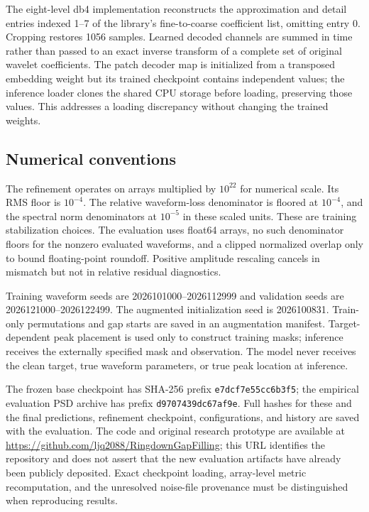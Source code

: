 \documentclass[10pt,prd,aps,a4paper,twocolumn,superscriptaddress,nofootinbib,floatfix]{revtex4-2}
\begin{document}
The eight-level db4 implementation reconstructs the approximation and detail entries indexed 1--7 of the library's fine-to-coarse coefficient list, omitting entry 0. Cropping restores 1056 samples. Learned decoded channels are summed in time rather than passed to an exact inverse transform of a complete set of original wavelet coefficients. The patch decoder map is initialized from a transposed embedding weight but its trained checkpoint contains independent values; the inference loader clones the shared CPU storage before loading, preserving those values. This addresses a loading discrepancy without changing the trained weights.

\subsection{Numerical conventions}
The refinement operates on arrays multiplied by $10^{22}$ for numerical scale. Its RMS floor is $10^{-4}$. The relative waveform-loss denominator is floored at $10^{-4}$, and the spectral norm denominators at $10^{-5}$ in these scaled units. These are training stabilization choices. The evaluation uses float64 arrays, no such denominator floors for the nonzero evaluated waveforms, and a clipped normalized overlap only to bound floating-point roundoff. Positive amplitude rescaling cancels in mismatch but not in relative residual diagnostics.

Training waveform seeds are 2026101000--2026112999 and validation seeds are 2026121000--2026122499. The augmented initialization seed is 2026100831. Train-only permutations and gap starts are saved in an augmentation manifest. Target-dependent peak placement is used only to construct training masks; inference receives the externally specified mask and observation. The model never receives the clean target, true waveform parameters, or true peak location at inference.

The frozen base checkpoint has SHA-256 prefix \texttt{e7dcf7e55cc6b3f5}; the empirical evaluation PSD archive has prefix \texttt{d9707439dc67af9e}. Full hashes for these and the final predictions, refinement checkpoint, configurations, and history are saved with the evaluation. The code and original research prototype are available at \url{https://github.com/ljq2088/RingdownGapFilling}; this URL identifies the repository and does not assert that the new evaluation artifacts have already been publicly deposited. Exact checkpoint loading, array-level metric recomputation, and the unresolved noise-file provenance must be distinguished when reproducing results.
\end{document}
